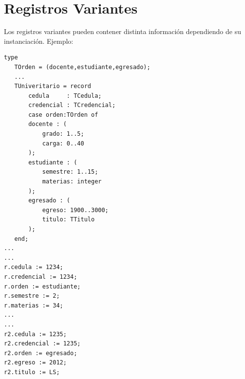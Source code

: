 \documentclass[a4paper,10pt]{article}
\begin{document}
\section{Registros Variantes}

Los registros variantes pueden contener distinta informaci\'on dependiendo de su instanciaci\'on. Ejemplo:\\
\begin{small}
\begin{verbatim}
type
   TOrden = (docente,estudiante,egresado);
   ...
   TUniveritario = record
       cedula     : TCedula;
       credencial : TCredencial;
       case orden:TOrden of
       docente : (
           grado: 1..5;
           carga: 0..40
       );
       estudiante : (
           semestre: 1..15;
           materias: integer
       );
       egresado : (
           egreso: 1900..3000;
           titulo: TTitulo
       );
   end; 
...
...
r.cedula := 1234;
r.credencial := 1234;
r.orden := estudiante;
r.semestre := 2;
r.materias := 34;
...
...
r2.cedula := 1235;
r2.credencial := 1235;
r2.orden := egresado;
r2.egreso := 2012;
r2.titulo := LS;
\end{verbatim}
\end{small}
\end{document}
